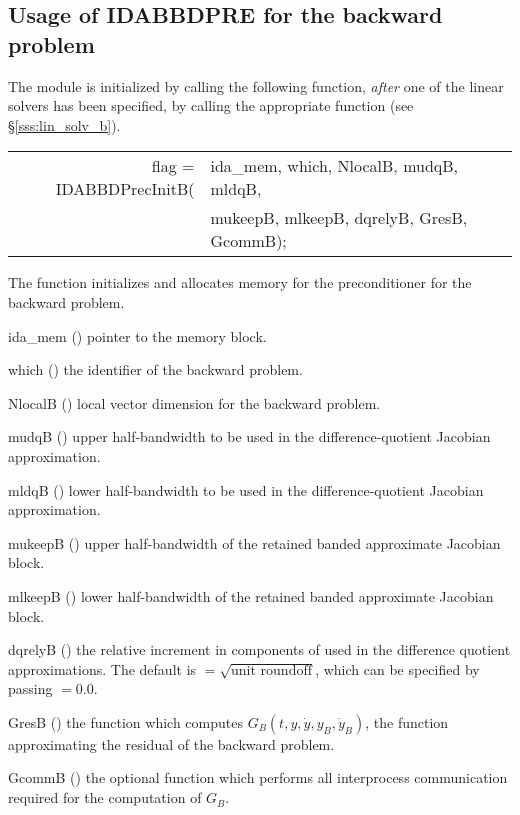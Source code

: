 \subsection{Usage of IDABBDPRE for the backward problem}
The {\idabbdpre} module is initialized by calling the following function,
{\em after} one of the {\idaspils} linear solvers has been specified,
by calling the appropriate function (see \S\ref{sss:lin_solv_b}).
{
  \begin{tabular}[t]{@{}r@{}l@{}}
    flag = IDABBDPrecInitB(&ida\_mem, which, NlocalB, mudqB, mldqB,\\
                           &mukeepB, mlkeepB, dqrelyB, GresB, GcommB);
  \end{tabular}
}
{
  The function  initializes and allocates
  memory for the {\idabbdpre} preconditioner for the backward problem.
}
{
  \begin{args}
  \item[ida\_mem] ()
    pointer to the {\idas} memory block.
  \item[which] ()
    the identifier of the backward problem.
  \item[NlocalB] ()
    local vector dimension for the backward problem.
  \item[mudqB] ()
    upper half-bandwidth to be used in the difference-quotient Jacobian approximation.
  \item[mldqB] ()
    lower half-bandwidth to be used in the difference-quotient Jacobian approximation.
  \item[mukeepB] ()
    upper half-bandwidth of the retained banded approximate Jacobian block.
  \item[mlkeepB] ()
    lower half-bandwidth of the retained banded approximate Jacobian block.
  \item[dqrelyB] ()
    the relative increment in components of  used in the difference quotient
    approximations.  The default is $ = \sqrt{\text{unit roundoff}}$, which
    can be specified by passing $ = 0.0$.
  \item[GresB] ()
    the {\C} function which computes $G_B(t,y,\dot y, y_B, \dot y_B)$, the
    function approximating the residual of the backward problem. 
  \item[GcommB] ()
    the optional {\C} function which performs all interprocess communication required for
    the computation of $G_B$.
  \end{args}
}
